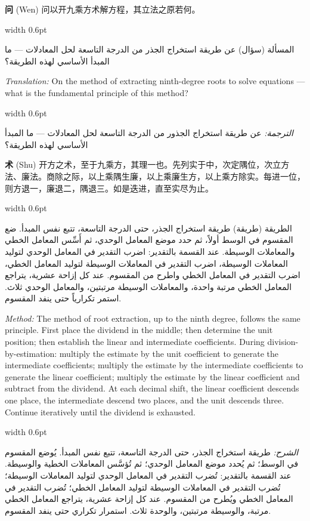 \documentclass[11pt,a4paper]{article}
\newlength{\cnwidth}
\newlength{\arwidth}
\newcommand{\paralleltext}[2]{%
  \par\medskip\noindent
  \begin{minipage}[t]{\cnwidth}%
    \small #1%
  \end{minipage}%
  \hfill\textcolor{colrule}{\vrule width 0.6pt}\hfill
  \begin{minipage}[t]{\arwidth}%
    \small\arabicfont\beginR #2\endR%
  \end{minipage}%
  \par\medskip
}
\newcommand{\cnlabel}[1]{\textbf{\color{notecolor}#1}}
\newcommand{\arlabel}[1]{\arabicfontbf\color{notecolor}\beginR #1\endR}
\begin{document}
\paralleltext{%
\cnlabel{问} (Wen) 问以开九乘方术解方程，其立法之原若何。
}{%
\arlabel{المسألة} (سؤال) عن طريقة استخراج الجذر من الدرجة التاسعة لحل المعادلات --- ما المبدأ الأساسي لهذه الطريقة؟
}

\paralleltext{%
\textit{Translation:} On the method of extracting ninth-degree roots to solve equations --- what is the fundamental principle of this method?
}{%
\textit{الترجمة:} عن طريقة استخراج الجذور من الدرجة التاسعة لحل المعادلات --- ما المبدأ الأساسي لهذه الطريقة؟
}

\paralleltext{%
\cnlabel{术} (Shu) 开方之术，至于九乘方，其理一也。先列实于中，次定隅位，次立方法、廉法。商除之际，以上乘隅生廉，以上乘廉生方，以上乘方除实。每进一位，则方退一，廉退二，隅退三。如是迭进，直至实尽为止。
}{%
\arlabel{الطريقة} (طريقة) طريقة استخراج الجذر، حتى الدرجة التاسعة، تتبع نفس المبدأ. ضع المقسوم في الوسط أولاً، ثم حدد موضع المعامل الوحدي، ثم أَسِّس المعامل الخطي والمعاملات الوسيطة. عند القسمة بالتقدير: اضرب التقدير في المعامل الوحدي لتوليد المعاملات الوسيطة، اضرب التقدير في المعاملات الوسيطة لتوليد المعامل الخطي، اضرب التقدير في المعامل الخطي واطرح من المقسوم. عند كل إزاحة عشرية، يتراجع المعامل الخطي مرتبة واحدة، والمعاملات الوسيطة مرتبتين، والمعامل الوحدي ثلاث. استمر تكرارياً حتى ينفد المقسوم.
}

\paralleltext{%
\textit{Method:} The method of root extraction, up to the ninth degree, follows the same principle. First place the dividend in the middle; then determine the unit position; then establish the linear and intermediate coefficients. During division-by-estimation: multiply the estimate by the unit coefficient to generate the intermediate coefficients; multiply the estimate by the intermediate coefficients to generate the linear coefficient; multiply the estimate by the linear coefficient and subtract from the dividend. At each decimal shift, the linear coefficient descends one place, the intermediate descend two places, and the unit descends three. Continue iteratively until the dividend is exhausted.
}{%
\textit{الشرح:} طريقة استخراج الجذر، حتى الدرجة التاسعة، تتبع نفس المبدأ. يُوضع المقسوم في الوسط؛ ثم يُحدد موضع المعامل الوحدي؛ ثم تُؤسَّس المعاملات الخطية والوسيطة. عند القسمة بالتقدير: تُضرب التقدير في المعامل الوحدي لتوليد المعاملات الوسيطة؛ تُضرب التقدير في المعاملات الوسيطة لتوليد المعامل الخطي؛ تُضرب التقدير في المعامل الخطي ويُطرح من المقسوم. عند كل إزاحة عشرية، يتراجع المعامل الخطي مرتبة، والوسيطة مرتبتين، والوحدة ثلاث. استمرار تكراري حتى ينفد المقسوم.
}
\end{document}
